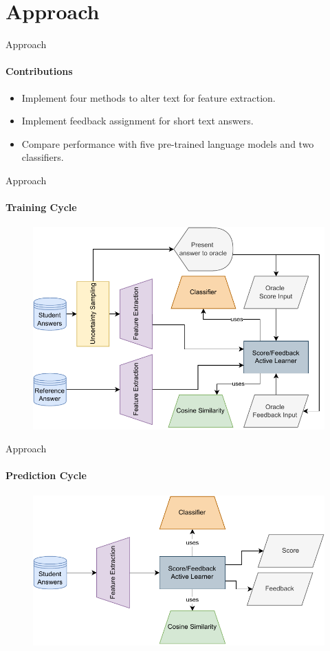 \documentclass[aspectratio=169]{beamer}
\begin{document}
\section{Approach}

\begin{frame}{Approach}
\framesubtitle{Contributions}
\begin{itemize}
	\item Implement four methods to alter text for feature extraction.
	\item Implement feedback assignment for short text answers.
	\item Compare performance with five pre-trained language models and two classifiers.
\end{itemize}
\end{frame}

\begin{frame}{Approach}
	\framesubtitle{Training Cycle}
	\begin{figure}
		\centering
		\includegraphics[scale = 0.67]{images/architecture_training.pdf}
		\label{fig:architecture train}
	\end{figure}
\end{frame}
\begin{frame}{Approach}
\framesubtitle{Prediction Cycle}
\begin{figure}
	\centering
	\includegraphics[scale = 0.75]{images/architecture_prediction.pdf}
	\label{fig:architecture predict}
\end{figure}
\end{frame}
\end{document}
